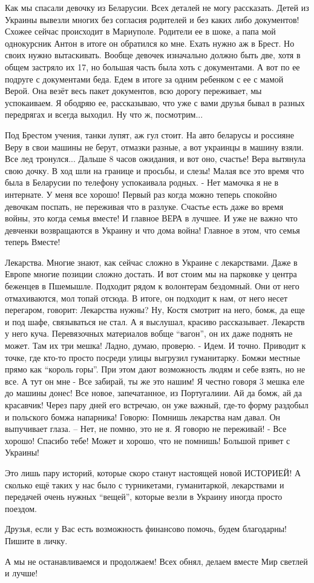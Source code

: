 Как мы спасали девочку из Беларусии. Всех деталей не могу рассказать. Детей из
Украины вывезли многих без согласия родителей и без каких либо документов!
Схожее сейчас происходит в Мариуполе. Родители ее в шоке, а папа мой
однокурсник Антон в итоге он обратился ко мне. Ехать нужно аж в Брест. Но своих
нужно вытаскивать. Вообще девочек изначально  должно быть две, хотя в общем
застряло их 17,  но большая часть была хоть с документами.  А вот по ее подруге
с документами беда.  Едем в итоге  за  одним ребенком с ее с мамой Верой.  Она
везёт весь пакет документов, всю дорогу переживает, мы успокаиваем.  Я ободряю
ее, рассказываю, что  уже с вами друзья  бывал в разных передрягах и всегда
выходил. Ну что ж, посмотрим...

Под Брестом учения, танки лупят, аж гул стоит. На авто беларусы и россияне Веру
в свои машины не берут, отмазки разные, а вот украинцы в машину взяли. Все лед
тронулся... Дальше 8 часов ожидания, и вот оно, счастье! Вера вытянула свою
дочку.  В ход шли  на границе и  просьбы, и слезы!  Малая все это время что
была в Беларусии по телефону успокаивала родных. - Нет мамочка я не в
интернате. У меня все хорошо! Первый раз когда можно теперь спокойно девочкам
поспать, не переживая что в разлуке.  Счастье есть даже во время войны, это
когда семья вместе! И главное ВЕРА в лучшее. И уже не важно что девченки
возвращаются в Украину и что дома война! Главное в этом, что семья теперь
Вместе!

Лекарства. Многие знают, как сейчас сложно  в Украине с лекарствами. Даже в
Европе многие позиции сложно достать. И вот стоим мы на парковке у центра
беженцев в Пшемышле. Подходит рядом к волонтерам бездомный. Они от него
отмахиваются, мол топай отсюда. В итоге, он подходит к нам, от него несет
перегаром, говорит: Лекарства нужны? Ну, Костя смотрит на него, бомж, да еще и
под шафе, связываться не стал. А я выслушал, красиво рассказывает. Лекарств у
него куча. Перевязочных материалов вобще \enquote{вагон}, он их даже поднять не
может.  Там их три мешка! Ладно, думаю, проверю. - Идем. И точно. Приводит к
точке, где кто-то просто посреди улицы выгрузил гуманитарку. Бомжи местные
прямо как \enquote{король горы}. При этом дают возможность людям и себе взять,
но не все. А тут он мне - Все забирай, ты же это нашим! Я честно говоря 3 мешка
еле до машины донес! Все новое, запечатанное, из Португалиии. Ай да бомж, ай да
красавчик!  Через пару дней его встречаю, он уже важный, где-то форму раздобыл
и польского бомжа напарника! Говорю: Помнишь лекарства нам давал. Он
выпучивает глаза. – Нет, не помню, это не я. Я говорю не переживай! - Все
хорошо!  Спасибо тебе!
Может и хорошо, что не помнишь! Большой привет с Украины!

Это лишь пару историй, которые скоро станут настоящей новой  ИСТОРИЕЙ! А
сколько ещё таких у нас  было с турникетами, гуманитаркой, лекарствами и
передачей очень нужных \enquote{вещей},  которые везли в Украину иногда просто
поездом.

Друзья, если у Вас есть возможность финансово помочь, будем благодарны! Пишите в личку.

А мы  не останавливаемся  и продолжаем! Всех обнял, делаем вместе Мир светлей и
лучше!

